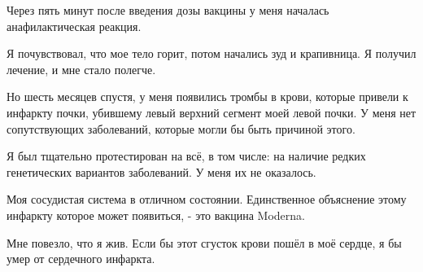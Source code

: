 Через пять минут после введения дозы вакцины у меня началась анафилактическая
реакция.

Я почувствовал, что мое тело горит, потом начались зуд и крапивница. Я получил
лечение, и мне стало полегче.

Но шесть месяцев спустя, у меня появились тромбы в крови, которые привели к
инфаркту почки, убившему левый верхний сегмент моей левой почки. У меня нет
сопутствующих заболеваний, которые могли бы быть причиной этого.

Я был тщательно протестирован на всё, в том числе: на наличие редких
генетических вариантов заболеваний. У меня их не оказалось.

Моя сосудистая система в отличном состоянии. Единственное объяснение этому
инфаркту которое может появиться, - это вакцина Moderna.

Мне повезло, что я жив. Если бы этот сгусток крови пошёл в моё сердце, я бы умер
от сердечного инфаркта.

